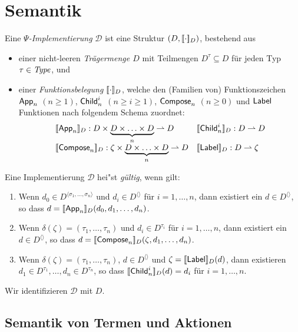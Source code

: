 \documentclass[%
  12pt,%
  a4paper,%
]{article}
\begin{document}
\section*{Semantik}

Eine \emph{$\Psi$-Implementierung} $\mathcal{D}$ ist eine Struktur $(D,[\![\cdot]\!]_D)$, bestehend aus
\begin{itemize}
\item einer nicht-leeren \emph{Tr\"agermenge $D$} mit Teilmengen $D^\tau \subseteq D$ f\"ur jeden Typ
  $\tau \in \mathit{Type}$, und
\item einer \emph{Funktionsbelegung $[\![\cdot]\!]_D$}, welche den (Familien von) Funktionszeichen
  $\mathsf{App}_n$ $(n \ge 1)$, $\mathsf{Child}_n^i$ $(n \ge i \ge 1)$, $\mathsf{Compose}_n$ $(n \ge 0)$ und $\mathsf{Label}$ Funktionen
  nach folgendem Schema zuordnet:
  \[\begin{array}{ll}
    \sem{\App_n}_D: D \times \underbrace{D \times \ldots \times D}_n \pto D &
    \sem{\Child_n^i}_D: D \pto D \\
    \sem{\Compose_n}_D: \zeta \times \underbrace{D \times \ldots \times D}_n \pto D &
    \sem{\Label}_D: D \pto \zeta \\
  \end{array}\]
\end{itemize}
Eine Implementierung $\mathcal{D}$ hei"st \emph{g\"ultig}, wenn gilt:
\begin{enumerate}
\item Wenn $d_0 \in D^{\langle \sigma_1,\ldots,\sigma_n \rangle}$ und $d_i \in D^{\langle \rangle}$ f\"ur $i=1,\ldots,n$,
  dann existiert ein $d \in D^{\langle \rangle}$, so dass $d = [\![\mathsf{App}_n]\!]_D(d_0,d_1,\ldots,d_n)$.
\item Wenn $\delta(\zeta) = (\tau_1,\ldots,\tau_n)$ und $d_i \in D^{\tau_i}$ f\"ur $i=1,\ldots,n$,
  dann existiert ein $d \in D^{\langle \rangle}$, so dass $d = [\![\mathsf{Compose}_n]\!]_D(\zeta,d_1,\ldots,d_n)$.
\item Wenn $\delta(\zeta) = (\tau_1,\ldots,\tau_n)$, $d \in D^{\langle \rangle}$ und $\zeta = [\![\mathsf{Label}]\!]_D(d)$, dann
  existieren $d_1 \in D^{\tau_1},\ldots,d_n \in D^{\tau_n}$, so dass $[\![\mathsf{Child}_n^i]\!]_D(d) = d_i$ f\"ur $i=1,\ldots,n$.
\end{enumerate}
Wir identifizieren $\mathcal{D}$ mit $D$.

\subsection*{Semantik von Termen und Aktionen}
\end{document}
